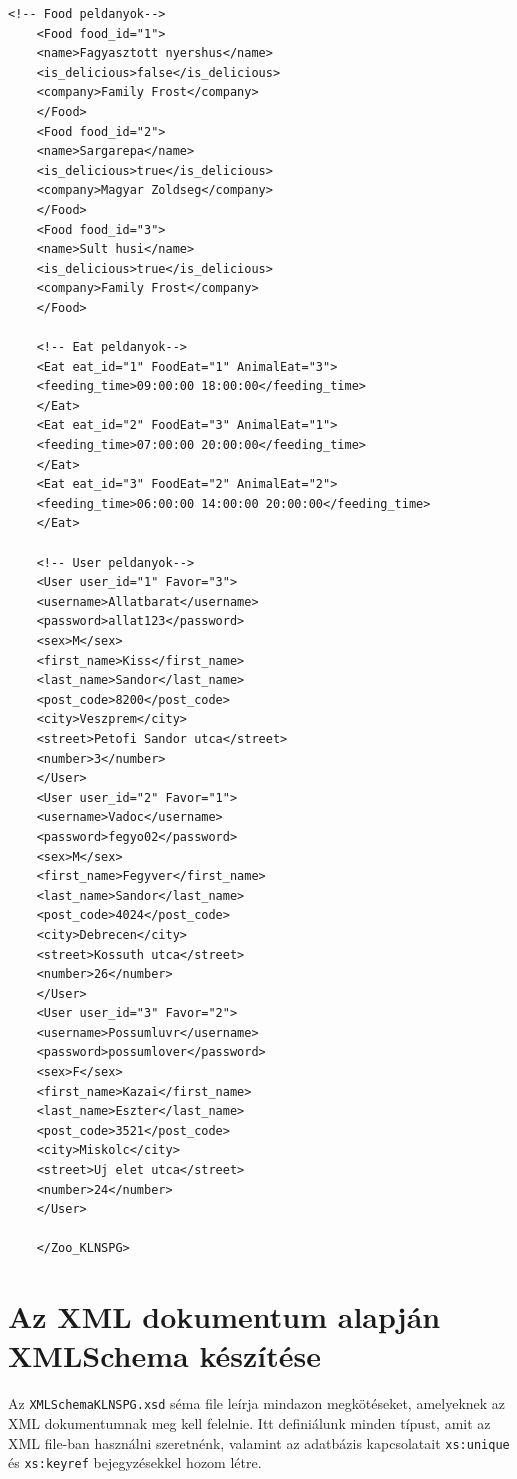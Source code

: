 \documentclass[12pt]{report}
\begin{document}
\begin{lstlisting}[caption={Az XML dokumentum}]
	<!-- Food peldanyok-->
	<Food food_id="1">
	<name>Fagyasztott nyershus</name>
	<is_delicious>false</is_delicious>
	<company>Family Frost</company>
	</Food>
	<Food food_id="2">
	<name>Sargarepa</name>
	<is_delicious>true</is_delicious>
	<company>Magyar Zoldseg</company>
	</Food>
	<Food food_id="3">
	<name>Sult husi</name>
	<is_delicious>true</is_delicious>
	<company>Family Frost</company>
	</Food>
	
	<!-- Eat peldanyok-->
	<Eat eat_id="1" FoodEat="1" AnimalEat="3">
	<feeding_time>09:00:00 18:00:00</feeding_time>
	</Eat>
	<Eat eat_id="2" FoodEat="3" AnimalEat="1">
	<feeding_time>07:00:00 20:00:00</feeding_time>
	</Eat>
	<Eat eat_id="3" FoodEat="2" AnimalEat="2">
	<feeding_time>06:00:00 14:00:00 20:00:00</feeding_time>
	</Eat>    
	
	<!-- User peldanyok-->
	<User user_id="1" Favor="3">
	<username>Allatbarat</username>
	<password>allat123</password>
	<sex>M</sex>
	<first_name>Kiss</first_name>
	<last_name>Sandor</last_name>
	<post_code>8200</post_code>
	<city>Veszprem</city>
	<street>Petofi Sandor utca</street>
	<number>3</number>
	</User>
	<User user_id="2" Favor="1">
	<username>Vadoc</username>
	<password>fegyo02</password>
	<sex>M</sex>
	<first_name>Fegyver</first_name>
	<last_name>Sandor</last_name>
	<post_code>4024</post_code>
	<city>Debrecen</city>
	<street>Kossuth utca</street>
	<number>26</number>
	</User>
	<User user_id="3" Favor="2">
	<username>Possumluvr</username>
	<password>possumlover</password>
	<sex>F</sex>
	<first_name>Kazai</first_name>
	<last_name>Eszter</last_name>
	<post_code>3521</post_code>
	<city>Miskolc</city>
	<street>Uj elet utca</street>
	<number>24</number>
	</User>
	
	</Zoo_KLNSPG>
\end{lstlisting}
\clearpage

\section{Az XML dokumentum alapján XMLSchema készítése}
\indent\indent Az \texttt{XMLSchemaKLNSPG.xsd} séma file leírja mindazon megkötéseket, amelyeknek az XML dokumentumnak meg kell felelnie. Itt definiálunk minden típust, amit az XML file-ban használni szeretnénk, valamint az adatbázis kapcsolatait \texttt{xs:unique} és \texttt{xs:keyref} bejegyzésekkel hozom létre.
\end{document}

